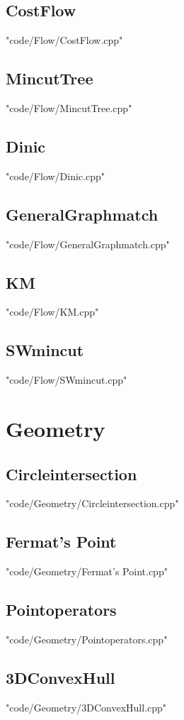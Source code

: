 \documentclass [8pt,a4paper,twocolumn]{article}
\begin{document}
\subsection{CostFlow}
 {"code/Flow/CostFlow.cpp"}
\subsection{MincutTree}
 {"code/Flow/MincutTree.cpp"}
\subsection{Dinic}
 {"code/Flow/Dinic.cpp"}
\subsection{GeneralGraphmatch}
 {"code/Flow/GeneralGraphmatch.cpp"}
\subsection{KM}
 {"code/Flow/KM.cpp"}
\subsection{SWmincut}
 {"code/Flow/SWmincut.cpp"}
\section{Geometry}
\subsection{Circleintersection}
 {"code/Geometry/Circleintersection.cpp"}
\subsection{Fermat's Point}
 {"code/Geometry/Fermat's Point.cpp"}
\subsection{Pointoperators}
 {"code/Geometry/Pointoperators.cpp"}
\subsection{3DConvexHull}
 {"code/Geometry/3DConvexHull.cpp"}
\end{document}
